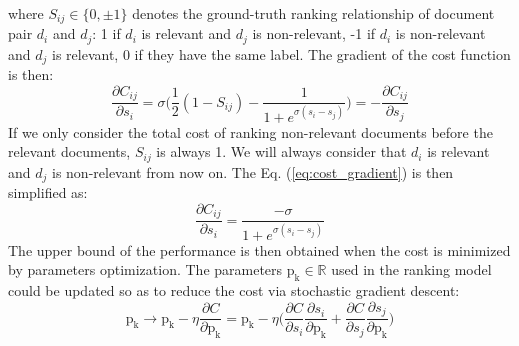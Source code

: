 where $S_{ij}\in {\{0, \pm 1\}}$ denotes the ground-truth ranking relationship 
of document pair $d_i$ and $d_j$: 1 if $d_i$ is relevant and $d_j$ is 
non-relevant, -1 if $d_i$ is non-relevant and $d_j$ is relevant, 0 if 
they have the same label.
The gradient of the cost function is then:
\begin{equation}
\label{eq:cost_gradient}
\frac{\partial C_{ij}}{\partial s_i} = \sigma \bigg(\frac{1}{2}(1-S_{ij})-\frac{1}{1+e^{\sigma(s_i-s_j)}}\bigg)=-\frac{\partial C_{ij}}{\partial s_j}
\end{equation}
If we only consider the total cost of ranking non-relevant 
documents before the relevant documents, $S_{ij}$ is always 1. 
We will always consider that $d_i$ is relevant and $d_j$ is non-relevant 
from now on.
The Eq. (\ref{eq:cost_gradient}) is then simplified as:
\begin{equation}
\label{eq:cost_gradient_simp}
\frac{\partial C_{ij}}{\partial s_i} = \frac{-\sigma}{1+e^{\sigma(s_i-s_j)}}
\end{equation}
The upper bound of the performance is then obtained when the cost is 
minimized by parameters optimization. 
The parameters $\mathrm{p_k}\in \mathbb{R}$ used in the ranking model 
could be updated so as to reduce the cost via stochastic gradient 
descent: 
\begin{equation}
\label{eq:cost_update_para}
\mathrm{p_k} \rightarrow \mathrm{p_k}-\eta\frac{\partial C}{\partial \mathrm{p_k}} = \mathrm{p_k} - \eta \bigg( \frac{\partial C}{\partial s_i} \frac{\partial s_i}{\partial \mathrm{p_k}} + \frac{\partial C}{\partial s_j} \frac{\partial s_j}{\partial \mathrm{p_k}} \bigg)
\end{equation}


